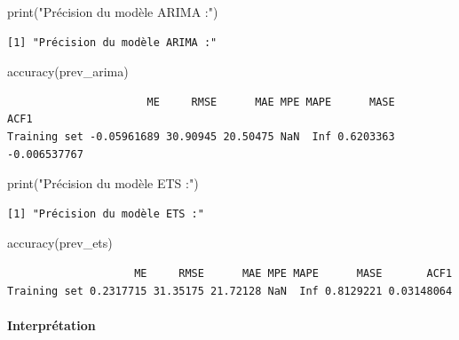 \documentclass[
  letterpaper,
  DIV=11,
  numbers=noendperiod]{scrartcl}
\let\oldparagraph\paragraph
\renewcommand{\paragraph}[1]{\oldparagraph{#1}\mbox{}}
\newenvironment{Shaded}{\begin{snugshade}}{\end{snugshade}}
\newcommand{\FunctionTok}[1]{\textcolor[rgb]{0.28,0.35,0.67}{#1}}
\newcommand{\NormalTok}[1]{\textcolor[rgb]{0.00,0.23,0.31}{#1}}
\newcommand{\StringTok}[1]{\textcolor[rgb]{0.13,0.47,0.30}{#1}}
\begin{document}
\begin{Shaded}
\begin{Highlighting}[]
\FunctionTok{print}\NormalTok{(}\StringTok{"Précision du modèle ARIMA :"}\NormalTok{)}
\end{Highlighting}
\end{Shaded}

\begin{verbatim}
[1] "Précision du modèle ARIMA :"
\end{verbatim}

\begin{Shaded}
\begin{Highlighting}[]
\FunctionTok{accuracy}\NormalTok{(prev\_arima)}
\end{Highlighting}
\end{Shaded}

\begin{verbatim}
                      ME     RMSE      MAE MPE MAPE      MASE         ACF1
Training set -0.05961689 30.90945 20.50475 NaN  Inf 0.6203363 -0.006537767
\end{verbatim}

\begin{Shaded}
\begin{Highlighting}[]
\FunctionTok{print}\NormalTok{(}\StringTok{"Précision du modèle ETS :"}\NormalTok{)}
\end{Highlighting}
\end{Shaded}

\begin{verbatim}
[1] "Précision du modèle ETS :"
\end{verbatim}

\begin{Shaded}
\begin{Highlighting}[]
\FunctionTok{accuracy}\NormalTok{(prev\_ets)}
\end{Highlighting}
\end{Shaded}

\begin{verbatim}
                    ME     RMSE      MAE MPE MAPE      MASE       ACF1
Training set 0.2317715 31.35175 21.72128 NaN  Inf 0.8129221 0.03148064
\end{verbatim}

\paragraph{Interprétation}\label{interpruxe9tation-7}
\end{document}
